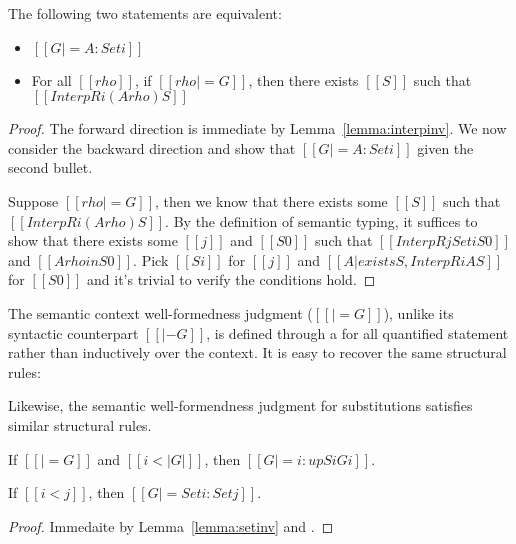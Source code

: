 \documentclass[nonacm]{acmart}
\begin{document}
\begin{lemma}
  \label{lemma:setinv}
  The following two statements are equivalent:
  \begin{itemize}
  \item $[[G |= A : Set i]]$
  \item For all $[[rho]]$, if $[[rho |= G]]$, then there exists
    $[[S]]$ such that $[[InterpR i (A {rho}) S]]$
  \end{itemize}
\end{lemma}
\begin{proof}
  The forward direction is immediate by
  Lemma~\ref{lemma:interpinv}. We now consider the backward direction
  and show that $[[G |= A : Set i]]$ given the second bullet.

  Suppose $[[rho |= G]]$, then we know that there exists some $[[S]]$
  such that $[[InterpR i (A {rho}) S]]$. By the definition of semantic
  typing, it suffices to show that there exists some $[[j]]$ and
  $[[S0]]$ such that  $[[InterpR j Set i S0]]$ and $[[A {rho} in
  S0]]$.
  Pick $[[S i]]$ for $[[j]]$ and $[[ { A | exists S , InterpR i A S }
  ]]$ for $[[S0]]$ and it's trivial to verify the conditions hold.
\end{proof}

The semantic context well-formedness judgment ($[[|= G]]$), unlike its syntactic
counterpart $[[|- G]]$, is defined through a for all quantified statement rather
than inductively over the context. It is easy to recover the same
structural rules:
\begin{lemma}[TODO]

\end{lemma}

Likewise, the semantic well-formendness judgment for substitutions
satisfies similar structural rules.



\begin{lemma}[ST-Var]
  If $[[|= G]]$ and $[[i < |G|]]$, then $[[G |= i : up S i G i]]$.
\end{lemma}

\begin{lemma}[ST-Set]
  If $[[i < j]]$, then $[[G |= Set i : Set j]]$.
\end{lemma}
\begin{proof}
  Immedaite by Lemma~\ref{lemma:setinv} and .
\end{proof}
\end{document}
